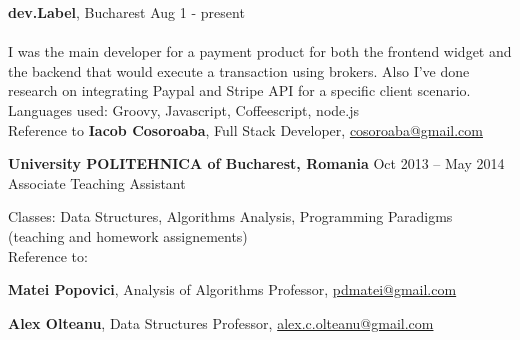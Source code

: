 \documentclass[margin,line]{resume}
\begin{document}
\begin{resume}
    \vspace{1.2mm}\textbf{dev.Label}, Bucharest
	\hfill Aug 1 - present\vspace{1mm}\\
    \selectfont{Frontend \& Backend Developer}\vspace{1.2mm}\\
    {\fontsize{2.65mm}{1em}\selectfont
      I was the main developer for a payment product for both the frontend widget and the backend that would execute a transaction using brokers. Also I've done research on integrating Paypal and Stripe API for a specific client scenario.\\
      Languages used: Groovy, Javascript, Coffeescript, node.js\\
      Reference to \textbf{Iacob Cosoroaba}, Full Stack Developer, \href{mailto:cosoroaba@gmail.com}{cosoroaba@gmail.com}
     }

	\vspace{1.2mm}\textbf{University POLITEHNICA of Bucharest, Romania}
		\hfill Oct 2013 -- May 2014\vspace{1mm}\\
		Associate Teaching Assistant\vspace{1.2mm}\\
    {\fontsize{2.65mm}{1em}\selectfont
      Classes: Data Structures, Algorithms Analysis, Programming Paradigms (teaching and homework assignements)\\
      Reference to:
      \begin{list2}
          \item \textbf{Matei Popovici}, Analysis of Algorithms Professor, \href{mailto:pdmatei@gmail.com}{pdmatei@gmail.com}
          \item \textbf{Alex Olteanu}, Data Structures Professor, \href{mailto:alex.c.olteanu@gmail.com}{alex.c.olteanu@gmail.com}
      \end{list2}
    }


\end{resume}
\end{document}
